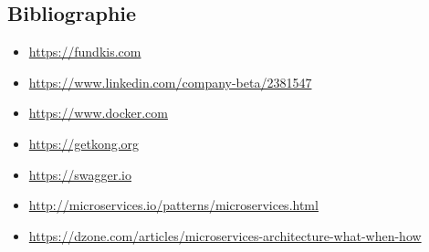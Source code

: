\documentclass[a4paper, 12pt]{article}
\begin{document}
\newpage
\subsection*{Bibliographie}

\begin{itemize}
\item \url{https://fundkis.com}
\item \url{https://www.linkedin.com/company-beta/2381547}
\item \url{https://www.docker.com}
\item \url{https://getkong.org}
\item \url{https://swagger.io}
\item \url{http://microservices.io/patterns/microservices.html}
\item \url{https://dzone.com/articles/microservices-architecture-what-when-how}
\end{itemize}
\label{fin}


\end{document}
